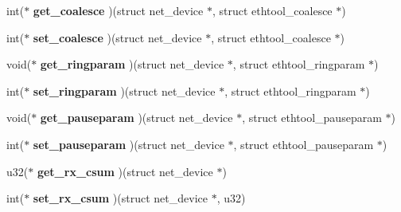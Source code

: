 \begin{DoxyCompactItemize}
\item 
\hypertarget{struct__kc__ethtool__ops_ae0f2651db82209cbf8be7b82a186056a}{
int($\ast$ {\bfseries get\_\-coalesce} )(struct net\_\-device $\ast$, struct ethtool\_\-coalesce $\ast$)}
\label{struct__kc__ethtool__ops_ae0f2651db82209cbf8be7b82a186056a}

\item 
\hypertarget{struct__kc__ethtool__ops_acf905d61dea694ecf11a23eece8f671f}{
int($\ast$ {\bfseries set\_\-coalesce} )(struct net\_\-device $\ast$, struct ethtool\_\-coalesce $\ast$)}
\label{struct__kc__ethtool__ops_acf905d61dea694ecf11a23eece8f671f}

\item 
\hypertarget{struct__kc__ethtool__ops_a5c323da432079a4c09de781af21bd253}{
void($\ast$ {\bfseries get\_\-ringparam} )(struct net\_\-device $\ast$, struct ethtool\_\-ringparam $\ast$)}
\label{struct__kc__ethtool__ops_a5c323da432079a4c09de781af21bd253}

\item 
\hypertarget{struct__kc__ethtool__ops_abee80c2366fbc36dfb35d94e015ac95d}{
int($\ast$ {\bfseries set\_\-ringparam} )(struct net\_\-device $\ast$, struct ethtool\_\-ringparam $\ast$)}
\label{struct__kc__ethtool__ops_abee80c2366fbc36dfb35d94e015ac95d}

\item 
\hypertarget{struct__kc__ethtool__ops_a0f1ee35eaadce3c5a70f02adec69869c}{
void($\ast$ {\bfseries get\_\-pauseparam} )(struct net\_\-device $\ast$, struct ethtool\_\-pauseparam $\ast$)}
\label{struct__kc__ethtool__ops_a0f1ee35eaadce3c5a70f02adec69869c}

\item 
\hypertarget{struct__kc__ethtool__ops_aca586c3062eeacee54156b5756aecf0f}{
int($\ast$ {\bfseries set\_\-pauseparam} )(struct net\_\-device $\ast$, struct ethtool\_\-pauseparam $\ast$)}
\label{struct__kc__ethtool__ops_aca586c3062eeacee54156b5756aecf0f}

\item 
\hypertarget{struct__kc__ethtool__ops_a9f27ac69bb4961d666e60e06a448944a}{
u32($\ast$ {\bfseries get\_\-rx\_\-csum} )(struct net\_\-device $\ast$)}
\label{struct__kc__ethtool__ops_a9f27ac69bb4961d666e60e06a448944a}

\item 
\hypertarget{struct__kc__ethtool__ops_a02ee07ab414354dd3680733cbdb26091}{
int($\ast$ {\bfseries set\_\-rx\_\-csum} )(struct net\_\-device $\ast$, u32)}
\label{struct__kc__ethtool__ops_a02ee07ab414354dd3680733cbdb26091}


\end{DoxyCompactItemize}
